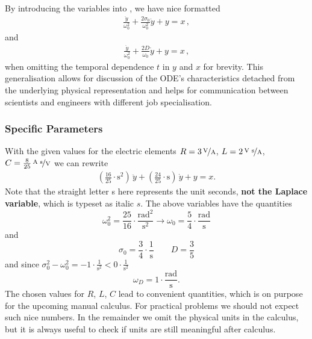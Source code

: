 By introducing the variables into , we have nice formatted
\begin{align}
\label{eq:ODE_sigma0}
\boxed{
\frac{\ddot{y}}{\omega_0^2} + \frac{2 \sigma_0}{\omega_0^2} \dot{y} + y = x
}\,,
\end{align}
and
\begin{align}
\label{eq:ODE_D}
\boxed{
\frac{\ddot{y}}{\omega_0^2} + \frac{2 D}{\omega_0} \dot{y} + y = x}\,,
\end{align}
when omitting the temporal dependence $t$ in $y$ and $x$ for brevity.
%
This generalisation allows for discussion of the ODE's characteristics detached
from the underlying physical representation and helps for communication between
scientists and engineers with different job specialisation.



\subsubsection{Specific Parameters}
With the given values for the electric elements
$R = 3\,\nicefrac{\text{V}}{\text{A}}$,
$L=2\,\nicefrac{\text{V s}}{\text{A}}$,
$C=\frac{8}{25}\,\nicefrac{\text{A s}}{\text{V}}$
we can rewrite 
\begin{align}
\boxed{
(\frac{16}{25} \cdot \text{s}^2) \, \ddot{y} + (\frac{24}{25} \cdot \text{s})
\, \dot{y} + y = x.
}
\end{align}
Note that the straight letter s here represents the unit seconds, \textbf{not the Laplace
variable}, which is typeset as italic $s$.
%
The above variables have the quantities
\begin{equation}
\omega_0^2 = \frac{25}{16} \cdot \frac{\text{rad}^2}{\text{s}^2}
\rightarrow \omega_0 = \frac{5}{4} \cdot \frac{\text{rad}}{\text{s}}
\end{equation}
and
\begin{equation}
\sigma_0 = \frac{3}{4}\cdot \frac{\text{1}}{\text{s}}
\qquad D = \frac{3}{5}
\end{equation}
and since $\sigma_0^2 - \omega_0^2 = -1 \cdot \frac{1}{\text{s}^2}< 0\cdot \frac{1}{\text{s}^2}$
\begin{equation}
\omega_D = 1 \cdot \frac{\text{rad}}{\text{s}}.
\end{equation}
%
The chosen values for $R$, $L$, $C$ lead to convenient quantities, which is on
purpose for the upcoming manual calculus. For practical problems we should not
expect such nice numbers.
%
In the remainder we omit the physical units in the calculus, but it is always
useful to check if units are still meaningful after calculus.



